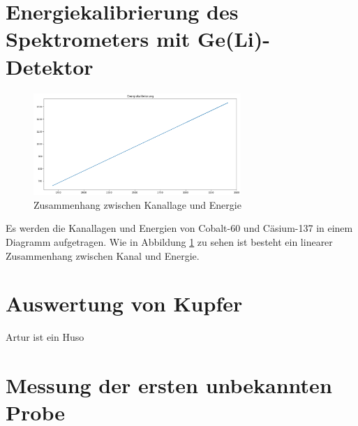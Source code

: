 \documentclass[12pt,german]{article}
\begin{document}
    \section{Energiekalibrierung des Spektrometers mit Ge(Li)-Detektor}
    \begin{figure}[H]
        \centering
        \includegraphics[width=0.7\textwidth]{pics/energiekalibrierung.png}
        \caption{Zusammenhang zwischen Kanallage und Energie}
        \label{fig:kanalenergie}
    \end{figure}
    Es werden die Kanallagen und Energien von Cobalt-60 und Cäsium-137 in einem Diagramm aufgetragen.
    Wie in Abbildung \ref{fig:kanalenergie} zu sehen ist besteht ein linearer Zusammenhang zwischen Kanal und Energie.

    \section{Auswertung von Kupfer}
    Artur ist ein Huso

    \section{Messung der ersten unbekannten Probe}
    
\end{document}

